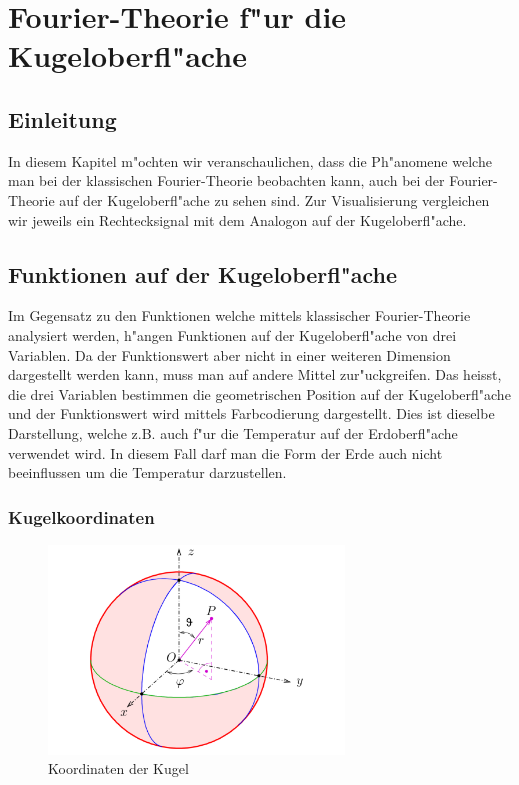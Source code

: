 \chapter{Fourier-Theorie f"ur die Kugeloberfl"ache
\label{chapter:kugel}}
\begin{refsection}

\section{Einleitung}
In diesem Kapitel m"ochten wir veranschaulichen, dass die Ph"anomene 
welche man bei der klassischen Fourier-Theorie beobachten kann, 
auch bei der Fourier-Theorie auf der Kugeloberfl"ache zu sehen sind.
Zur Visualisierung vergleichen wir jeweils ein Rechtecksignal mit 
dem Analogon auf der Kugeloberfl"ache.

\section{Funktionen auf der Kugeloberfl"ache}
Im Gegensatz zu den Funktionen welche mittels klassischer 
Fourier-Theorie analysiert werden, h"angen Funktionen auf der 
Kugeloberfl"ache von drei Variablen. 
Da der Funktionswert aber nicht in einer weiteren Dimension 
dargestellt werden kann, muss man auf andere Mittel zur"uckgreifen. 
Das heisst, die drei Variablen bestimmen die geometrischen Position
auf der Kugeloberfl"ache und der Funktionswert wird mittels 
Farbcodierung dargestellt. 
Dies ist dieselbe Darstellung, welche z.B. auch f"ur die Temperatur 
auf der Erdoberfl"ache verwendet wird. In diesem Fall darf man die 
Form der Erde auch nicht beeinflussen um die Temperatur darzustellen.
\subsection{Kugelkoordinaten}
\begin{figure}%
\centering
\includegraphics[width=0.7\textwidth]{kugel/Kugelkoord.pdf}
\caption{Koordinaten der Kugel
\label{skript:Koordinaten der Kugel}}
\end{figure}


\end{refsection}
